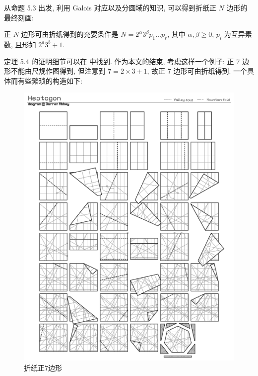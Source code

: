 从命题 5.3 出发, 利用 Galois 对应以及分圆域的知识, 可以得到折纸正 $N$ 边形的最终刻画: 

\begin{theorem}
    正 $N$ 边形可由折纸得到的充要条件是 $N=2^\alpha 3^\beta p_1\dots p_r$,
     其中 $\alpha,\beta\geq 0$, $p_i$ 为互异素数, 且形如 $2^a3^b+1$.
\end{theorem}

定理 5.4 的证明细节可以在 \cite{Vid} 中找到.
作为本文的结束, 考虑这样一个例子: 正 $7$ 边形不能由尺规作图得到, 
但注意到 $7=2\times 3+1$, 故正 $7$ 边形可由折纸得到. 
一个具体而有些繁琐的构造如下: 

\begin{figure}[h]
    \centering
    \includegraphics[scale=0.5]{7-gons.png}
    \caption{折纸正7边形}
\end{figure}
